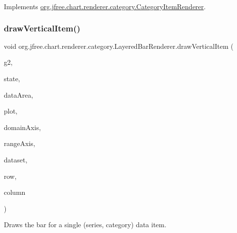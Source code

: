 Implements \mbox{\hyperlink{interfaceorg_1_1jfree_1_1chart_1_1renderer_1_1category_1_1_category_item_renderer_ac18a046a47d2b991ab2c968ce3363aea}{org.\+jfree.\+chart.\+renderer.\+category.\+Category\+Item\+Renderer}}.

\mbox{\label{classorg_1_1jfree_1_1chart_1_1renderer_1_1category_1_1_layered_bar_renderer_a8db261847cf22386e6e4c4f86e6ee4d6}} 
\subsubsection{\texorpdfstring{draw\+Vertical\+Item()}{drawVerticalItem()}}
{\footnotesize\ttfamily void org.\+jfree.\+chart.\+renderer.\+category.\+Layered\+Bar\+Renderer.\+draw\+Vertical\+Item (\begin{DoxyParamCaption}\item[{Graphics2D}]{g2,  }\item[{\mbox{\hyperlink{classorg_1_1jfree_1_1chart_1_1renderer_1_1category_1_1_category_item_renderer_state}{Category\+Item\+Renderer\+State}}}]{state,  }\item[{Rectangle2D}]{data\+Area,  }\item[{\mbox{\hyperlink{classorg_1_1jfree_1_1chart_1_1plot_1_1_category_plot}{Category\+Plot}}}]{plot,  }\item[{\mbox{\hyperlink{classorg_1_1jfree_1_1chart_1_1axis_1_1_category_axis}{Category\+Axis}}}]{domain\+Axis,  }\item[{\mbox{\hyperlink{classorg_1_1jfree_1_1chart_1_1axis_1_1_value_axis}{Value\+Axis}}}]{range\+Axis,  }\item[{\mbox{\hyperlink{interfaceorg_1_1jfree_1_1data_1_1category_1_1_category_dataset}{Category\+Dataset}}}]{dataset,  }\item[{int}]{row,  }\item[{int}]{column }\end{DoxyParamCaption})\hspace{0.3cm}{\ttfamily [protected]}}

Draws the bar for a single (series, category) data item.


